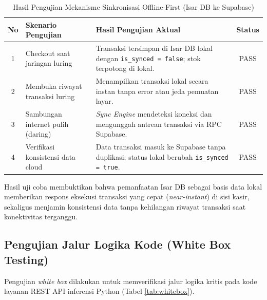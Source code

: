 \documentclass[10pt,a4paper]{article}
\begin{document}
\begin{table}[htbp]
  \centering
  \caption{Hasil Pengujian Mekanisme Sinkronisasi Offline-First (Isar DB ke Supabase)}
  \label{tab:sinkronisasi}
  \fontsize{8pt}{10.5pt}\selectfont
  \begin{tabularx}{\textwidth}{cp{4.5cm}Xc}
    \toprule
    \textbf{No} & \textbf{Skenario Pengujian} & \textbf{Hasil Pengujian Aktual} & \textbf{Status} \\
    \midrule
    1 & Checkout saat jaringan luring & Transaksi tersimpan di Isar DB lokal dengan \texttt{is\_synced = false}; stok terpotong di lokal. & PASS \\
    2 & Membuka riwayat transaksi luring & Menampilkan transaksi lokal secara instan tanpa error atau jeda pemuatan layar. & PASS \\
    3 & Sambungan internet pulih (daring) & \textit{Sync Engine} mendeteksi koneksi dan mengunggah antrean transaksi via RPC Supabase. & PASS \\
    4 & Verifikasi konsistensi data cloud & Data transaksi masuk ke Supabase tanpa duplikasi; status lokal berubah \texttt{is\_synced = true}. & PASS \\
    \bottomrule
  \end{tabularx}
\end{table}

Hasil uji coba membuktikan bahwa pemanfaatan Isar DB sebagai basis data lokal memberikan respons eksekusi transaksi yang cepat (\textit{near-instant}) di sisi kasir, sekaligus menjamin konsistensi data tanpa kehilangan riwayat transaksi saat konektivitas terganggu.

\subsection{Pengujian Jalur Logika Kode (White Box Testing)}
Pengujian \textit{white box} dilakukan untuk memverifikasi jalur logika kritis pada kode layanan REST API inferensi Python (Tabel \ref{tab:whitebox}).
\end{document}
